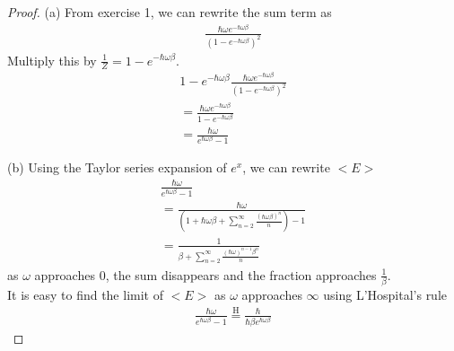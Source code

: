 \documentclass[10pt]{article}
\begin{document}
	\begin{proof}
		(a) From exercise 1, we can rewrite the sum term as
		\begin{align*}
			\frac{\hbar \omega e^{-\hbar \omega \beta}}{(1-e^{-\hbar \omega \beta})^{2}}
		\end{align*}
		Multiply this by $\frac{1}{Z} = 1-e^{-\hbar \omega \beta}$.
		\begin{align*}
			1-e^{-\hbar \omega \beta}\frac{\hbar \omega e^{-\hbar \omega \beta}}{(1-e^{-\hbar \omega \beta})^{2}}\\
			=\frac{\hbar \omega e^{-\hbar \omega \beta}}{1-e^{-\hbar \omega \beta}}\\
			=\frac{\hbar \omega}{e^{\hbar \omega \beta}-1}
		\end{align*}
		
		(b) Using the Taylor series expansion of $e^{x}$, we can rewrite $<E>$
		\begin{align*}
			\frac{\hbar \omega}{e^{\hbar \omega \beta}-1}\\
			= \frac{\hbar \omega}{(1 + \hbar \omega \beta + \sum_{n=2}^{\infty} \frac{(\hbar \omega \beta)^{n}}{n}) -1}\\
			=\frac{1}{\beta + \sum_{n=2}^{\infty} \frac{(\hbar \omega)^{n-1} \beta^{n}}{n}}
		\end{align*}
		as $\omega$ approaches $0$, the sum disappears and the fraction approaches $\frac{1}{\beta}$.\\
		It is easy to find the limit of $<E>$ as $\omega$ approaches $\infty$ using L'Hospital's rule
		\begin{align*}
			\frac{\hbar \omega}{e^{\hbar \omega \beta}-1} \overset{\mathrm{H}}{=}
			\frac{\hbar}{\hbar \beta e^{\hbar \omega \beta}}
		\end{align*}
	\end{proof}

	
\end{document}
